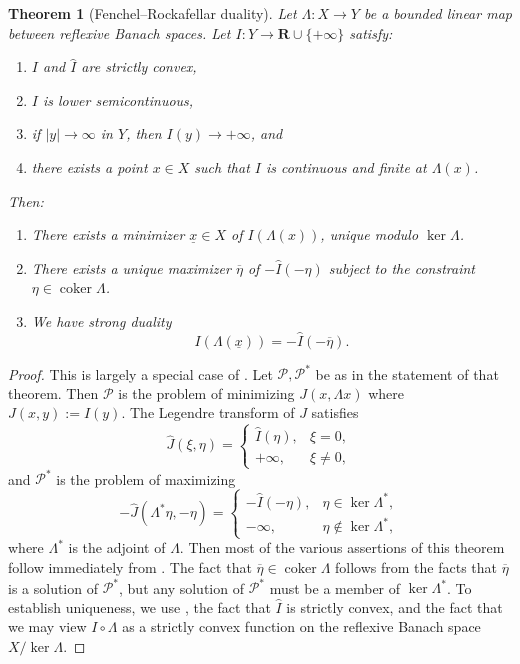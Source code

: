 \documentclass[reqno,11pt]{amsart}
\newcommand{\RR}{\mathbf{R}}
\DeclareMathOperator{\coker}{coker}
\newcommand{\dfn}[1]{\emph{#1}\index{#1}}
\newtheorem{theorem}{Theorem}[section]
\theoremstyle{definition}
\numberwithin{equation}{section}
\begin{document}
\begin{theorem}[Fenchel--Rockafellar duality]\label{abstract convex analysis}
Let $\Lambda : X \to Y$ be a bounded linear map between reflexive Banach spaces.
Let $I: Y \to \RR \cup \{+\infty\}$ satisfy:
\begin{enumerate}
\item $I$ and $\hat I$ are strictly convex,
\item $I$ is lower semicontinuous,
\item if $|y| \to \infty$ in $Y$, then $I(y) \to +\infty$, and 
\item there exists a point $x \in X$ such that $I$ is continuous and finite at $\Lambda(x)$.
\end{enumerate}
Then:
\begin{enumerate}
\item There exists a minimizer $\underline x \in X$ of $I(\Lambda(x))$, unique modulo $\ker \Lambda$.
\item There exists a unique maximizer $\overline \eta$ of $-\hat I(-\eta)$ subject to the constraint $\eta \in \coker \Lambda$.
\item We have \dfn{strong duality}
\begin{equation}\label{abstract strong duality}
I(\Lambda(\underline x)) = -\hat I(-\overline \eta).
\end{equation}
\end{enumerate}
\end{theorem}
\begin{proof}
This is largely a special case of \cite[Chapter IV, Theorem 4.2]{Ekeland99}.
Let $\mathscr P, \mathscr P^*$ be as in the statement of that theorem.
Then $\mathscr P$ is the problem of minimizing $J(x, \Lambda x)$ where $J(x, y) := I(y)$.
The Legendre transform of $J$ satisfies 
$$\hat J(\xi, \eta) = \begin{cases} \hat I(\eta), & \xi = 0, \\
	+\infty, &\xi \neq 0,
\end{cases}$$
and $\mathscr P^*$ is the problem of maximizing
$$-\hat J(\Lambda^* \eta, -\eta) = \begin{cases}
	-\hat I(-\eta), &\eta \in \ker \Lambda^*, \\
	-\infty, &\eta \notin \ker \Lambda^*,
\end{cases}$$
where $\Lambda^*$ is the adjoint of $\Lambda$.
Then most of the various assertions of this theorem follow immediately from \cite[Chapter IV, Theorem 4.2]{Ekeland99}.
The fact that $\overline \eta \in \coker \Lambda$ follows from the facts that $\overline \eta$ is a solution of $\mathscr P^*$, but any solution of $\mathscr P^*$ must be a member of $\ker \Lambda^*$. 
To establish uniqueness, we use \cite[Chapter II, Proposition 1.2]{Ekeland99}, the fact that $\hat I$ is strictly convex, and the fact that we may view $I \circ \Lambda$ as a strictly convex function on the reflexive Banach space $X/\ker \Lambda$.
\end{proof}
\end{document}
